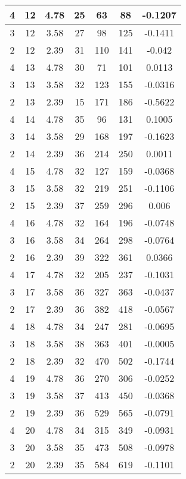 \documentclass[letterpaper, 12pt]{article}
\begin{document}
\begin{longtable}{|c|c|c|c|c|c|c|}
\hline
4 & 12 & 4.78 & 25 & 63 & 88 & -0.1207 \\
\hline
3 & 12 & 3.58 & 27 & 98 & 125 & -0.1411 \\
\hline
2 & 12 & 2.39 & 31 & 110 & 141 & -0.042 \\
\hline
4 & 13 & 4.78 & 30 & 71 & 101 & 0.0113 \\
\hline
3 & 13 & 3.58 & 32 & 123 & 155 & -0.0316 \\
\hline
2 & 13 & 2.39 & 15 & 171 & 186 & -0.5622 \\
\hline
4 & 14 & 4.78 & 35 & 96 & 131 & 0.1005 \\
\hline
3 & 14 & 3.58 & 29 & 168 & 197 & -0.1623 \\
\hline
2 & 14 & 2.39 & 36 & 214 & 250 & 0.0011 \\
\hline
4 & 15 & 4.78 & 32 & 127 & 159 & -0.0368 \\
\hline
3 & 15 & 3.58 & 32 & 219 & 251 & -0.1106 \\
\hline
2 & 15 & 2.39 & 37 & 259 & 296 & 0.006 \\
\hline
4 & 16 & 4.78 & 32 & 164 & 196 & -0.0748 \\
\hline
3 & 16 & 3.58 & 34 & 264 & 298 & -0.0764 \\
\hline
2 & 16 & 2.39 & 39 & 322 & 361 & 0.0366 \\
\hline
4 & 17 & 4.78 & 32 & 205 & 237 & -0.1031 \\
\hline
3 & 17 & 3.58 & 36 & 327 & 363 & -0.0437 \\
\hline
2 & 17 & 2.39 & 36 & 382 & 418 & -0.0567 \\
\hline
4 & 18 & 4.78 & 34 & 247 & 281 & -0.0695 \\
\hline
3 & 18 & 3.58 & 38 & 363 & 401 & -0.0005 \\
\hline
2 & 18 & 2.39 & 32 & 470 & 502 & -0.1744 \\
\hline
4 & 19 & 4.78 & 36 & 270 & 306 & -0.0252 \\
\hline
3 & 19 & 3.58 & 37 & 413 & 450 & -0.0368 \\
\hline
2 & 19 & 2.39 & 36 & 529 & 565 & -0.0791 \\
\hline
4 & 20 & 4.78 & 34 & 315 & 349 & -0.0931 \\
\hline
3 & 20 & 3.58 & 35 & 473 & 508 & -0.0978 \\
\hline
2 & 20 & 2.39 & 35 & 584 & 619 & -0.1101 \\
\hline
\end{longtable}
\end{document}
